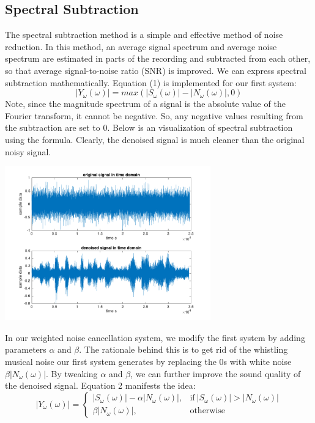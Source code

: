\documentclass[journal]{IEEEtran}
\begin{document}
\subsection{Spectral Subtraction}
\begin{flushleft}
The spectral subtraction method is a simple and effective method of noise reduction. In this method, an average signal spectrum and average noise spectrum are estimated in parts of the recording and subtracted from each other, so that average signal-to-noise ratio (SNR) is improved. We can express spectral subtraction mathematically. Equation (1) is implemented for our first system:
\begin{equation}
|Y_\omega(\omega)| = max(|S_\omega(\omega)|-|N_\omega(\omega)|,0)
\end{equation}
Note, since the magnitude spectrum of a signal is the absolute value of the Fourier transform, it cannot be negative. So, any negative values resulting from the subtraction are set to 0. Below is an visualization of spectral subtraction using the formula. Clearly, the denoised signal is much cleaner than the original noisy signal. 
\end{flushleft}
\centering 
\includegraphics[width=3.5in]{spectral_subtraction_plot}

\begin{flushleft}
In our weighted noise cancellation system, we modify the first system by adding parameters $\alpha$ and $\beta$. The rationale behind this is to get rid of the whistling musical noise our first system generates by replacing the 0s with white noise $\beta|N_\omega(\omega)|$. By tweaking $\alpha$ and $\beta$, we can further improve the sound quality of the denoised signal. Equation 2 manifests the idea:
\begin{equation}
    |Y_\omega(\omega)| =
    \begin{cases}
      |S_\omega(\omega)|-\alpha|N_\omega(\omega)|, & \text{if}\ |S_\omega(\omega)| > |N_\omega(\omega)|\\
      \beta|N_\omega(\omega)|, & \text{otherwise}
    \end{cases}
\end{equation}
\end{flushleft}
\end{document}
